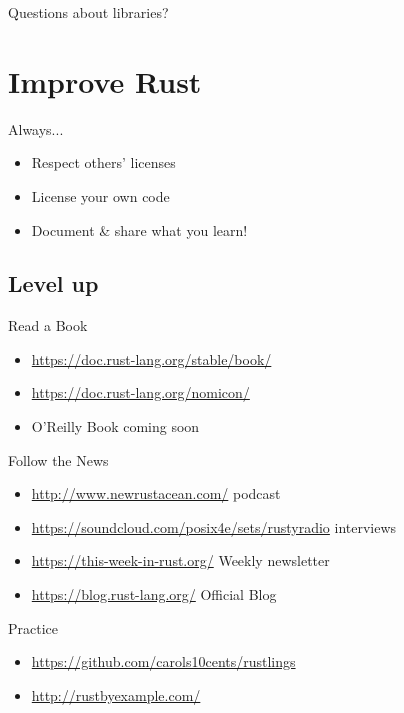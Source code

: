 \documentclass[aspectratio=169]{beamer}
\begin{document}
\begin{frame}
    \hfill Questions about libraries?
\end{frame}

\section{Improve Rust}

\begin{frame}
    Always...
    \begin{itemize}
        \item Respect others' licenses
        \item License your own code
        \item Document \& share what you learn!
    \end{itemize}
\end{frame}


\subsection{Level up}

\begin{frame}
    Read a Book
    \begin{itemize}
        \item \url{https://doc.rust-lang.org/stable/book/}
        \item \url{https://doc.rust-lang.org/nomicon/}
        \item O'Reilly Book coming soon
    \end{itemize}
\end{frame}

\begin{frame}
    Follow the News
    \begin{itemize}
        \item \url{http://www.newrustacean.com/} podcast
        \item \url{https://soundcloud.com/posix4e/sets/rustyradio} interviews
        \item \url{https://this-week-in-rust.org/} Weekly newsletter
        \item \url{https://blog.rust-lang.org/} Official Blog
    \end{itemize}
\end{frame}

\begin{frame}
    Practice
    \begin{itemize}
        \item \url{https://github.com/carols10cents/rustlings}
        \item \url{http://rustbyexample.com/}
    \end{itemize}
\end{frame}
\end{document}
